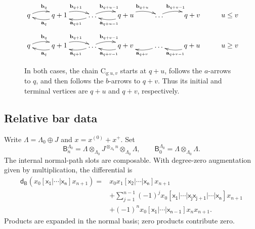 \documentclass[a4paper,11pt,oneside,reqno]{amsart}
\theoremstyle{definition}
\numberwithin{equation}{section}
\begin{document}
\begin{figure}
	\[
	\xymatrix{
		q  \ar@/^/[r]^{\mathbf{b}_q}   &\ar@/^/[l]^{\mathbf{a}_q} q+1 \ar@/^/[r]^{\mathbf{b}_{q+1}}  & \ar@/^/[l]^{\mathbf{a}_{q+1}}  \ldots \ar@/^/[r]^{\mathbf{b}_{q+u-1}}  & q+u \ar@/^/[l]^{\mathbf{a}_{q+u-1}} \ar@/^/[r]^{\mathbf{b}_{q+u}}  & \ldots \ar@/^/[r]^{\mathbf{b}_{q+v-1}} & q+v & \mbox{$u\le v$}
	}
	\]
	\[
	\xymatrix{
		q  \ar@/^/[r]^{\mathbf{b}_q}   &\ar@/^/[l]^{\mathbf{a}_q} q+1 \ar@/^/[r]^{\mathbf{b}_{q+1}}  & \ar@/^/[l]^{\mathbf{a}_{q+1}}  \ldots \ar@/^/[r]^{\mathbf{b}_{q+v-1}}  & q+v \ar@/^/[l]^{\mathbf{a}_{q+v-1}}  & \ar@/^/[l]^{\mathbf{a}_{q+v}}  \ldots &  \ar@/^/[l]^{\mathbf{a}_{q+v-1}} q+u & \mbox{$u\ge v$}
	}
	\]
	\caption{In both cases, the chain \(\mathrm C_{q;u,v}\) starts at \(q+u\), follows the \(a\)-arrows to \(q\), and then follows the \(b\)-arrows to \(q+v\). Thus its initial and terminal vertices are \(q+u\) and \(q+v\), respectively.
	}
\end{figure}




\subsection{Relative bar data}\label{sec:normalization}
Write $\Lambda=\Lambda_0\oplus J$ and $x=x^{(0)}+x^+$. Set
\begin{equation}\label{eq:relative-bar}
 \mathsf B_n^{\Lambda_0}=
 \Lambda\otimes_{\Lambda_0}J^{\otimes_{\Lambda_0}n}
 \otimes_{\Lambda_0}\Lambda,
 \qquad \mathsf B_0^{\Lambda_0}=\Lambda\otimes_{\Lambda_0}\Lambda.
\end{equation}
The internal normal-path slots are composable. With degree-zero
augmentation given by multiplication, the differential is
\begin{equation}\label{eq:bar-d}
 \begin{aligned}
 \mathsf d_{\mathsf B}(x_0\mathsf{[x_1|\cdots|x_n]}x_{n+1})={}&
 x_0x_1\mathsf{[x_2|\cdots|x_n]}x_{n+1}\\
 &+\sum_{j=1}^{n-1}(-1)^j
 x_0\mathsf{[x_1|\cdots|x_jx_{j+1}|\cdots|x_n]}x_{n+1}\\
 &+(-1)^nx_0\mathsf{[x_1|\cdots|x_{n-1}]}x_nx_{n+1}.
 \end{aligned}
\end{equation}
Products are expanded in the normal basis; zero products contribute zero.
\end{document}
